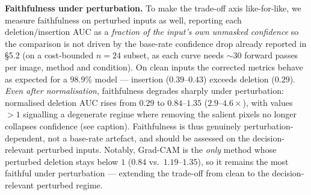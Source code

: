 \documentclass[runningheads]{llncs}
\begin{document}
\begin{table}[t]
\centering
\caption{Frozen (linear-probe) vs.\ fully fine-tuned EfficientNet-B0 on the
\emph{same} 38 images: explanation stability (Pearson $r$, mean [95\% CI]) and
class-sensitivity (higher $=$ more class-conditional; see Control~2). Score-CAM is
treated separately in Control~1. The three near-class-agnostic methods are the
three that stay stable; the strongly class-conditional method (Grad-CAM) collapses.}
\label{tab:ft}
\end{table}

\noindent\textbf{Faithfulness under perturbation.} To make the trade-off axis
like-for-like, we measure faithfulness on perturbed inputs as well, reporting each
deletion/insertion AUC as a \emph{fraction of the input's own unmasked confidence}
so the comparison is not driven by the base-rate confidence drop already reported
in \S5.2 (on a cost-bounded $n{=}24$ subset, as each curve needs $\sim$30 forward
passes per image, method and condition). On clean inputs the corrected metrics
behave as expected for a $98.9\%$ model --- insertion ($0.39$--$0.43$) exceeds
deletion ($0.29$). \emph{Even after normalisation}, faithfulness degrades sharply
under perturbation: normalised deletion AUC rises from $0.29$ to $0.84$--$1.35$
($2.9$--$4.6\times$), with values $>1$ signalling a degenerate regime where removing
the salient pixels no longer collapses confidence (see caption). Faithfulness is
thus genuinely perturbation-dependent, not a base-rate artefact, and should be
assessed on the decision-relevant perturbed inputs.
Notably, Grad-CAM is the \emph{only} method whose perturbed deletion stays below $1$
($0.84$ vs.\ $1.19$--$1.35$), so it remains the most faithful under perturbation ---
extending the trade-off from clean to the decision-relevant perturbed regime.
\end{document}
